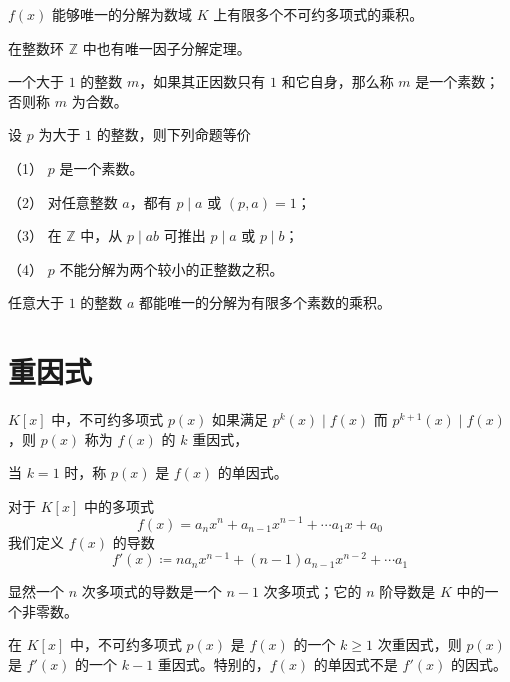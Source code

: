 \begin{theorem}
	$f(x)$ 能够唯一的分解为数域 $K$ 上有限多个不可约多项式的乘积。
\end{theorem}

在整数环 $\mathbb{Z}$ 中也有唯一因子分解定理。

\begin{definition}
	一个大于 $1$ 的整数 $m$，如果其正因数只有 $1$ 和它自身，那么称 $m$ 是一个素数；否则称 $m$ 为合数。
\end{definition}

\begin{theorem}
	设 $p$ 为大于 $1$ 的整数，则下列命题等价
	
	（1） $p$ 是一个素数。
	
	（2） 对任意整数 $a$，都有 $p \mid a$ 或 $(p,a) = 1$；
	
	（3） 在 $\mathbb{Z}$ 中，从 $p \mid ab$ 可推出 $p \mid a$ 或 $p \mid b$；
	
	（4） $p$ 不能分解为两个较小的正整数之积。
\end{theorem}

\begin{theorem}[算术基本定理]
	任意大于 $1$ 的整数 $a$ 都能唯一的分解为有限多个素数的乘积。
\end{theorem}

\section{重因式}

\begin{definition}
	$K[x]$ 中，不可约多项式 $p(x)$ 如果满足 $p^k(x) \mid f(x)$ 而 $p^{k+1}(x) \mid f(x)$，则 $p(x)$ 称为 $f(x)$ 的 $k$ 重因式，
\end{definition}

当 $k=1$ 时，称 $p(x)$ 是 $f(x)$ 的单因式。

\begin{definition}
	对于 $K[x]$ 中的多项式
	\[f(x) = a_nx^n + a_{n-1}x^{n-1} + \cdots a_1 x + a_0\]
	我们定义 $f(x)$ 的导数
	\[f'(x) \coloneqq  na_nx^{n-1} + (n-1)a_{n-1}x^{n-2} + \cdots a_1\]
\end{definition}

显然一个 $n$ 次多项式的导数是一个 $n-1$ 次多项式；它的 $n$ 阶导数是 $K$ 中的一个非零数。

\begin{theorem}
	在 $K[x]$ 中，不可约多项式 $p(x)$ 是 $f(x)$ 的一个 $k \geqslant 1$ 次重因式，则 $p(x)$ 是 $f'(x)$ 的一个 $k-1$ 重因式。特别的，$f(x)$ 的单因式不是 $f'(x)$ 的因式。
\end{theorem}

